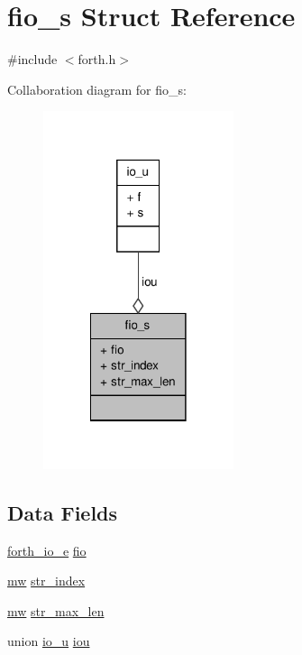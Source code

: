 \hypertarget{structfio__s}{\section{fio\-\_\-s Struct Reference}
\label{structfio__s}
}


{\ttfamily \#include $<$forth.\-h$>$}



Collaboration diagram for fio\-\_\-s\-:
\nopagebreak
\begin{figure}[H]
\begin{center}
\leavevmode
\includegraphics[width=158pt]{structfio__s__coll__graph}
\end{center}
\end{figure}
\subsection*{Data Fields}
\begin{DoxyCompactItemize}
\item 
\hyperlink{forth_8h_a06a05e94493d8896c9a2ff6385f1e686}{forth\-\_\-io\-\_\-e} \hyperlink{structfio__s_acbbc17cdfcfc9190ed0af199670fba33}{fio}
\item 
\hyperlink{forth_8h_aaec58f87481f4ec34b44a1db3e622ddc}{mw} \hyperlink{structfio__s_a6a40f69645ccdcc90111dd97c9e98027}{str\-\_\-index}
\item 
\hyperlink{forth_8h_aaec58f87481f4ec34b44a1db3e622ddc}{mw} \hyperlink{structfio__s_ad6ec0b91021e511e2e9df2c068858c74}{str\-\_\-max\-\_\-len}
\item 
union \hyperlink{unionio__u}{io\-\_\-u} \hyperlink{structfio__s_a3f24ec109b199f9500d313a19b62b304}{iou}
\end{DoxyCompactItemize}


